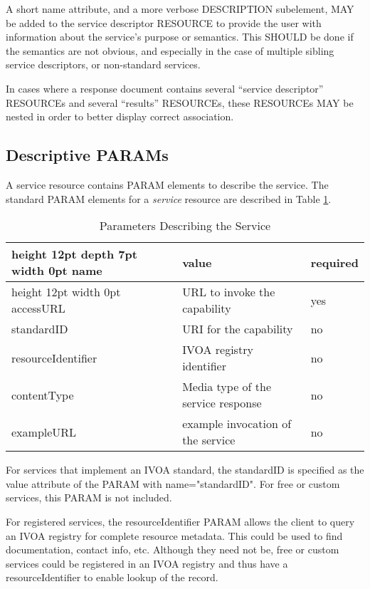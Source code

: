 \documentclass[11pt,a4paper]{ivoa}
\newcommand{\attval}[2]{#1={\allowbreak}{"}#2{"}}
\begin{document}
A short name attribute, and a more verbose DESCRIPTION  subelement,
MAY be added to the service descriptor RESOURCE to  provide the user
with information about the service's purpose or  semantics. This SHOULD
be done if the semantics are not obvious,  and especially in the case
of multiple sibling service  descriptors, or non-standard services.

In cases where a response document contains several ``service descriptor'' RESOURCEs
and several ``results'' RESOURCEs, these RESOURCEs MAY be nested in
order to better display correct association.

\subsection{Descriptive PARAMs}
\label{sec:descParams}

A service resource contains PARAM elements to describe the service.
The standard PARAM elements for a {\em service\/} resource
are described in Table \ref{tab:serviceParams}.

\begin{table}[h]
\begin{center}
\begin{tabular}{|l|l|l|}
\hline
\vrule height 12pt depth 7pt width 0pt {\bf name}          &  {\bf value}                          & {\bf required}  \\
\hline
\vrule height 12pt width 0pt accessURL           & URL to invoke the capability          &  yes  \\
standardID          & URI for the capability                &  no   \\
resourceIdentifier  & IVOA registry identifier              &  no   \\
contentType	        & Media type of the service response    & no \\
exampleURL          & example invocation of the service     & no \\
\hline
\end{tabular}
\end{center}
\caption{Parameters Describing the Service}
\label{tab:serviceParams}
\end{table}

For services that implement an IVOA standard, the standardID is specified
as the value attribute of the PARAM with \attval{name}{standardID}.
For free or custom services, this PARAM is not included.

For registered services, the resourceIdentifier PARAM allows the client
to query an IVOA registry for complete resource metadata. This could be
used to find documentation, contact info, etc. Although they need not be,
free or custom services could be registered in an IVOA registry and thus
have a resourceIdentifier to enable lookup of the record.
\end{document}
